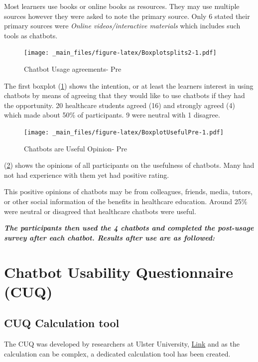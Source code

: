 \documentclass[a4paper, nobind]{templates/ociamthesis}
\begin{document}
Most learners use books or online books as resources. They may use multiple sources however they were asked to note the primary source. Only 6 stated their primary sources were \emph{Online videos/interactive materials} which includes such tools as chatbots.

\begin{figure}
\centering
\texttt{[image: \_main\_files/figure-latex/Boxplotsplits2-1.pdf]}
\caption{\label{fig:Boxplotsplits2}Chatbot Usage agreements- Pre}
\end{figure}

The first boxplot (\ref{fig:Boxplotsplits2}) shows the intention, or at least the learners interest in using chatbots by means of agreeing that they would like to use chatbots if they had the opportunity. 20 healthcare students agreed (16) and strongly agreed (4) which made about 50\% of participants. 9 were neutral with 1 disagree.

\begin{figure}
\centering
\texttt{[image: \_main\_files/figure-latex/BoxplotUsefulPre-1.pdf]}
\caption{\label{fig:BoxplotUsefulPre}Chatbots are Useful Opinion- Pre}
\end{figure}

(\ref{fig:BoxplotUsefulPre}) shows the opinions of all participants on the usefulness of chatbots. Many had not had experience with them yet had positive rating.

This positive opinions of chatbots may be from colleagues, friends, media, tutors, or other social information of the benefits in healthcare education. Around 25\% were neutral or disagreed that healthcare chatbots were useful.

\textbf{\emph{The participants then used the 4 chatbots and completed the post-usage survey after each chatbot. Results after use are as followed:}}

\hypertarget{chatbot-usability-questionnaire-cuq-1}{%
\section{Chatbot Usability Questionnaire (CUQ)}\label{chatbot-usability-questionnaire-cuq-1}}

\hypertarget{cuq-calculation-tool}{%
\subsection{CUQ Calculation tool}\label{cuq-calculation-tool}}

The CUQ was developed by researchers at Ulster University,
\href{https://www.ulster.ac.uk/research/topic/computer-science/artificial-intelligence/projects/cuq}{Link}
and as the calculation can be complex, a dedicated calculation tool has been created.
\end{document}
